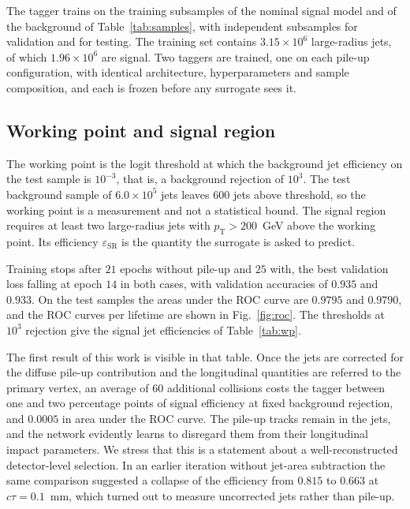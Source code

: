 \documentclass[a4paper,11pt]{article}
\newcommand{\ctau}{c\tau}
\newcommand{\pT}{p_{\mathrm{T}}}
\newcommand{\effSR}{\varepsilon_{\mathrm{SR}}}
\begin{document}
The tagger trains on the training subsamples of the nominal signal
model and of the background of Table~\ref{tab:samples}, with
independent subsamples for validation and for testing. The training
set contains $3.15\times10^6$ large-radius jets, of which
$1.96\times10^6$ are signal. Two taggers are trained, one on each
pile-up configuration, with identical architecture, hyperparameters and
sample composition, and each is frozen before any surrogate sees it.

\subsection{Working point and signal region}
\label{sec:sr}

The working point is the logit threshold at which the background jet
efficiency on the test sample is $10^{-3}$, that is, a background
rejection of $10^{3}$. The test background sample of $6.0\times10^5$
jets leaves $600$ jets above threshold, so the working point is a
measurement and not a statistical bound. The signal region requires at
least two large-radius jets with $\pT > 200$~GeV above the working
point. Its efficiency $\effSR$ is the quantity the surrogate is asked
to predict.

Training stops after $21$ epochs without pile-up and $25$ with, the
best validation loss falling at epoch $14$ in both cases, with
validation accuracies of $0.935$ and $0.933$. On the test samples the
areas under the ROC curve are $0.9795$ and $0.9790$, and the ROC curves
per lifetime are shown in Fig.~\ref{fig:roc}. The thresholds at
$10^{3}$ rejection give the signal jet efficiencies of
Table~\ref{tab:wp}.

The first result of this work is visible in that table. Once the jets
are corrected for the diffuse pile-up contribution and the longitudinal
quantities are referred to the primary vertex, an average of $60$
additional collisions costs the tagger between one and two percentage
points of signal efficiency at fixed background rejection, and $0.0005$
in area under the ROC curve. The pile-up tracks remain in the jets, and
the network evidently learns to disregard them from their longitudinal
impact parameters. We stress that this is a statement about a
well-reconstructed detector-level selection. In an earlier iteration
without jet-area subtraction the same comparison suggested a collapse
of the efficiency from $0.815$ to $0.663$ at $\ctau = 0.1$~mm, which
turned out to measure uncorrected jets rather than pile-up.
\end{document}
